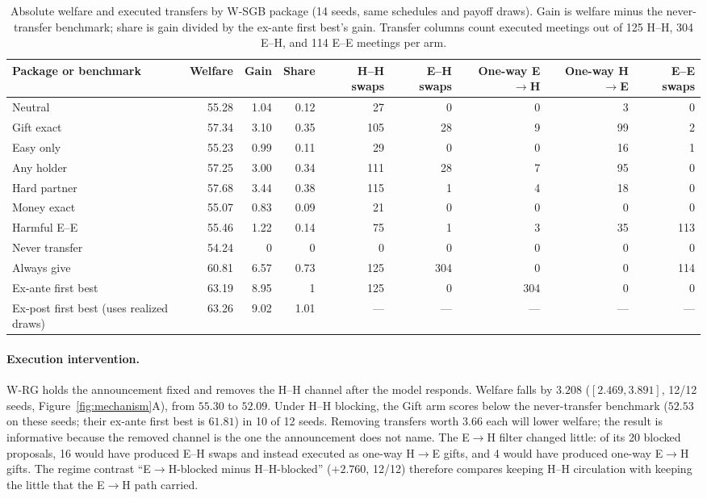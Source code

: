 \documentclass[sigconf,anonymous]{aamas}
\begin{document}
\begin{table}[t]
\caption{Absolute welfare and executed transfers by W-SGB package (14 seeds,
same schedules and payoff draws).  Gain is welfare minus the never-transfer
benchmark; share is gain divided by the ex-ante first best's gain.  Transfer
columns count executed meetings out of 125 H--H, 304 E--H, and 114 E--E meetings
per arm.}
\label{tab:welfare}
\footnotesize
\centering
\begin{tabular}{@{}lrrrrrrrr@{}}
\toprule
Package or benchmark & Welfare & Gain & Share & H--H swaps & E--H swaps & One-way E$\rightarrow$H & One-way H$\rightarrow$E & E--E swaps \\
\midrule
Neutral & 55.28 & 1.04 & 0.12 & 27 & 0 & 0 & 3 & 0 \\
Gift exact & 57.34 & 3.10 & 0.35 & 105 & 28 & 9 & 99 & 2 \\
Easy only & 55.23 & 0.99 & 0.11 & 29 & 0 & 0 & 16 & 1 \\
Any holder & 57.25 & 3.00 & 0.34 & 111 & 28 & 7 & 95 & 0 \\
Hard partner & 57.68 & 3.44 & 0.38 & 115 & 1 & 4 & 18 & 0 \\
Money exact & 55.07 & 0.83 & 0.09 & 21 & 0 & 0 & 0 & 0 \\
Harmful E--E & 55.46 & 1.22 & 0.14 & 75 & 1 & 3 & 35 & 113 \\
\midrule
Never transfer & 54.24 & 0 & 0 & 0 & 0 & 0 & 0 & 0 \\
Always give & 60.81 & 6.57 & 0.73 & 125 & 304 & 0 & 0 & 114 \\
Ex-ante first best & 63.19 & 8.95 & 1 & 125 & 0 & 304 & 0 & 0 \\
Ex-post first best (uses realized draws) & 63.26 & 9.02 & 1.01 & --- & --- & --- & --- & --- \\
\bottomrule
\end{tabular}
\end{table}

\paragraph{Execution intervention.}  W-RG holds the announcement fixed and
removes the H--H channel after the model responds.  Welfare falls by $3.208$
($[2.469,3.891]$, 12/12 seeds, Figure~\ref{fig:mechanism}A), from $55.30$ to
$52.09$.  Under H--H blocking, the Gift arm scores below the never-transfer
benchmark ($52.53$ on these seeds; their ex-ante first best is $61.81$) in 10 of
12 seeds.  Removing transfers worth $3.66$ each will lower welfare; the result
is informative because the removed channel is the one the announcement does
not name.  The E$\rightarrow$H filter changed little: of its 20
blocked proposals, 16 would have produced E--H swaps and instead executed as
one-way H$\rightarrow$E gifts, and 4 would have produced one-way E$\rightarrow$H
gifts.  The regime contrast ``E$\rightarrow$H-blocked minus H--H-blocked''
($+2.760$, 12/12) therefore compares keeping H--H circulation with keeping the
little that the E$\rightarrow$H path carried.
\end{document}
